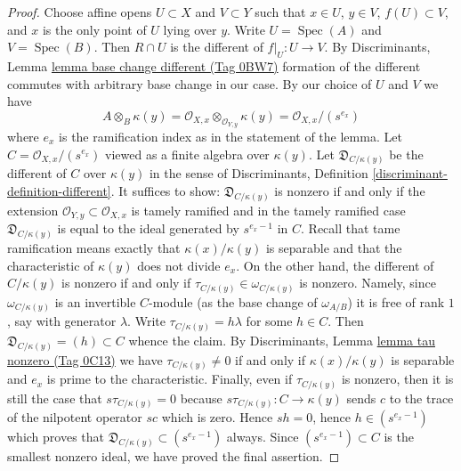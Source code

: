 \documentclass{amsart}
\theoremstyle{plain}
\theoremstyle{definition}
\theoremstyle{remark}
\numberwithin{equation}{subsection}
\def\Spec{\mathop{\mathrm{Spec}}}
\begin{document}
\begin{proof}
\medskip\noindent
Choose affine opens $U \subset X$ and $V \subset Y$
such that $x \in U$, $y \in V$, $f(U) \subset V$, and $x$ is the only
point of $U$ lying over $y$. Write $U = \Spec(A)$ and $V = \Spec(B)$.
Then $R \cap U$ is the different of $f|_U : U \to V$.
By Discriminants, Lemma \href{https://stacks.math.columbia.edu/tag/0BW7}{lemma base change different (Tag 0BW7)}
formation of the different commutes with arbitrary base change
in our case. By our choice of $U$ and $V$ we have
$$
A \otimes_B \kappa(y) =
\mathcal{O}_{X, x} \otimes_{\mathcal{O}_{Y, y}} \kappa(y) =
\mathcal{O}_{X, x}/(s^{e_x})
$$
where $e_x$ is the ramification index as in the statement of the lemma.
Let $C = \mathcal{O}_{X, x}/(s^{e_x})$ viewed as a finite algebra
over $\kappa(y)$. Let $\mathfrak{D}_{C/\kappa(y)}$ be the different
of $C$ over $\kappa(y)$ in the sense of
Discriminants, Definition \ref{discriminant-definition-different}.
It suffices to show: $\mathfrak{D}_{C/\kappa(y)}$
is nonzero if and only if the extension
$\mathcal{O}_{Y, y} \subset \mathcal{O}_{X, x}$ is tamely ramified
and in the tamely ramified case $\mathfrak{D}_{C/\kappa(y)}$
is equal to the ideal generated by $s^{e_x - 1}$ in $C$.
Recall that tame ramification means exactly that $\kappa(x)/\kappa(y)$
is separable and that the characteristic of $\kappa(y)$ does not
divide $e_x$. On the other hand, the different of $C/\kappa(y)$ is nonzero
if and only if $\tau_{C/\kappa(y)} \in \omega_{C/\kappa(y)}$ is nonzero.
Namely, since $\omega_{C/\kappa(y)}$ is an invertible $C$-module
(as the base change of $\omega_{A/B}$)
it is free of rank $1$, say with generator $\lambda$. Write
$\tau_{C/\kappa(y)} = h\lambda$ for some $h \in C$. Then
$\mathfrak{D}_{C/\kappa(y)} = (h) \subset C$ whence the claim.
By Discriminants, Lemma \href{https://stacks.math.columbia.edu/tag/0C13}{lemma tau nonzero (Tag 0C13)}
we have $\tau_{C/\kappa(y)} \not = 0$
if and only if $\kappa(x)/\kappa(y)$
is separable and $e_x$ is prime to the characteristic.
Finally, even if $\tau_{C/\kappa(y)}$ is nonzero, then
it is still the case that $s \tau_{C/\kappa(y)} = 0$
because $s\tau_{C/\kappa(y)} : C \to \kappa(y)$
sends $c$ to the trace of the nilpotent operator $sc$ which is zero.
Hence $sh = 0$, hence $h \in (s^{e_x - 1})$ which proves
that $\mathfrak{D}_{C/\kappa(y)} \subset (s^{e_x - 1})$ always.
Since $(s^{e_x - 1}) \subset C$ is the smallest nonzero ideal,
we have proved the final assertion.
\end{proof}
\end{document}
